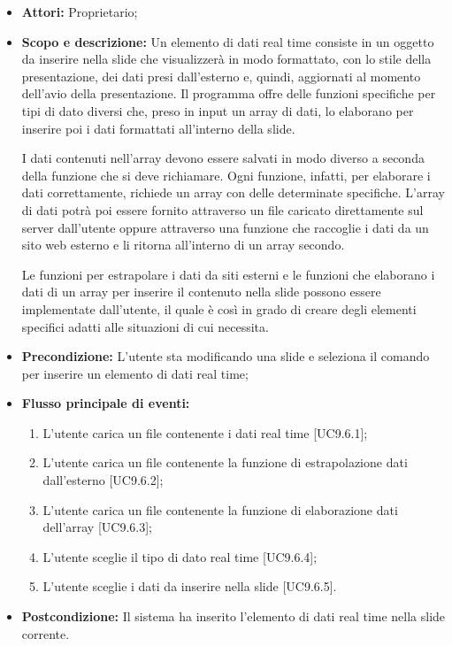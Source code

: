 \begin{itemize}
	\item \textbf{Attori:} Proprietario;
	\item \textbf{Scopo e descrizione:}	Un elemento di dati \gls{real time} consiste in un oggetto da inserire nella \gls{slide} che visualizzerà in modo formattato, con lo stile della presentazione, dei dati presi dall'esterno e, quindi, aggiornati al momento dell'avio della presentazione. Il programma offre delle funzioni specifiche per tipi di dato diversi che, preso in input un array di dati, lo elaborano per inserire poi i dati formattati all'interno della \gls{slide}.

	I dati contenuti nell'array devono essere salvati in modo diverso a seconda della funzione che si deve richiamare. Ogni funzione, infatti, per elaborare i dati correttamente, richiede un array con delle determinate specifiche.
	L'array di dati potrà poi essere fornito attraverso un file caricato direttamente sul server dall'utente oppure attraverso una funzione che raccoglie i dati da un sito web esterno e li ritorna all'interno di un array secondo.
	
	Le funzioni per estrapolare i dati da siti esterni e le funzioni che elaborano i dati di un array per inserire il contenuto nella \gls{slide} possono essere implementate dall'utente, il quale è così in grado di creare degli elementi specifici adatti alle situazioni di cui necessita.
	
	\item \textbf{Precondizione:} L'utente sta modificando una \gls{slide} e seleziona il comando per inserire un elemento di dati \gls{real time};
	\item \textbf{Flusso principale di eventi:}
	\begin{enumerate}
		\item L'utente carica un file contenente i dati \gls{real time} [UC9.6.1];
		\item L'utente carica un file contenente la funzione di estrapolazione dati dall'esterno [UC9.6.2];
		\item L'utente carica un file contenente la funzione di elaborazione dati dell'array [UC9.6.3];
		\item L'utente sceglie il tipo di dato \gls{real time} [UC9.6.4];
		\item L'utente sceglie i dati da inserire nella \gls{slide} [UC9.6.5].
	\end{enumerate}
	\item \textbf{Postcondizione:} Il sistema ha inserito l'elemento di dati \gls{real time} nella \gls{slide} corrente.
\end{itemize}

